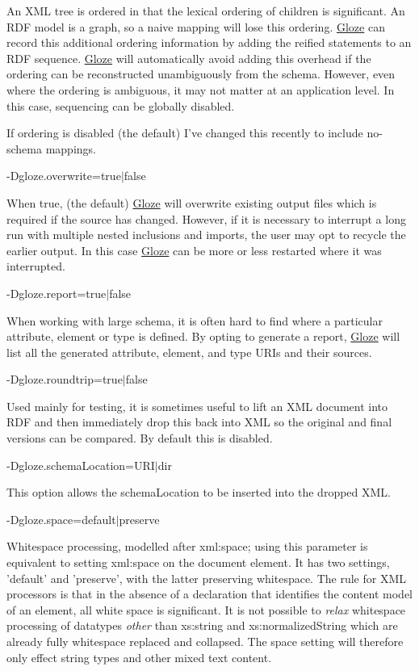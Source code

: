 An XML tree is ordered in that the lexical ordering of children is significant. An RDF model is a graph, so a naive mapping will lose this ordering. \hyperlink{classcom_1_1hp_1_1gloze_1_1_gloze}{Gloze} can record this additional ordering information by adding the reified statements to an RDF sequence. \hyperlink{classcom_1_1hp_1_1gloze_1_1_gloze}{Gloze} will automatically avoid adding this overhead if the ordering can be reconstructed unambiguously from the schema. However, even where the ordering is ambiguous, it may not matter at an application level. In this case, sequencing can be globally disabled.

If ordering is disabled (the default) I've changed this recently to include no-\/schema mappings.

{\ttfamily -\/Dgloze.overwrite=true$|$false}

When true, (the default) \hyperlink{classcom_1_1hp_1_1gloze_1_1_gloze}{Gloze} will overwrite existing output files which is required if the source has changed. However, if it is necessary to interrupt a long run with multiple nested inclusions and imports, the user may opt to recycle the earlier output. In this case \hyperlink{classcom_1_1hp_1_1gloze_1_1_gloze}{Gloze} can be more or less restarted where it was interrupted.

{\ttfamily -\/Dgloze.report=true$|$false}

When working with large schema, it is often hard to find where a particular attribute, element or type is defined. By opting to generate a report, \hyperlink{classcom_1_1hp_1_1gloze_1_1_gloze}{Gloze} will list all the generated attribute, element, and type URIs and their sources.

{\ttfamily -\/Dgloze.roundtrip=true$|$false}

Used mainly for testing, it is sometimes useful to lift an XML document into RDF and then immediately drop this back into XML so the original and final versions can be compared. By default this is disabled.

{\ttfamily -\/Dgloze.schemaLocation=URI$|$dir}

This option allows the schemaLocation to be inserted into the dropped XML.

{\ttfamily -\/Dgloze.space=default$|$preserve}

Whitespace processing, modelled after xml:space; using this parameter is equivalent to setting xml:space on the document element. It has two settings, 'default' and 'preserve', with the latter preserving whitespace. The rule for XML processors is that in the absence of a declaration that identifies the content model of an element, all white space is significant. It is not possible to {\itshape relax\/} whitespace processing of datatypes {\itshape other\/} than xs:string and xs:normalizedString which are already fully whitespace replaced and collapsed. The space setting will therefore only effect string types and other mixed text content.


